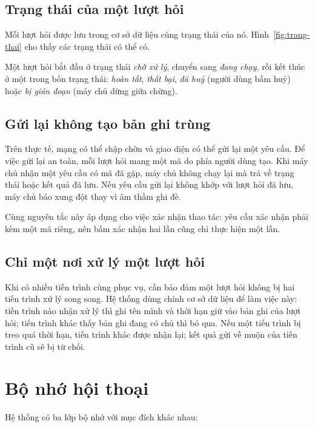 \subsection{Trạng thái của một lượt hỏi}

Mỗi lượt hỏi được lưu trong cơ sở dữ liệu cùng trạng thái của nó. Hình~\ref{fig:trang-thai} cho thấy các trạng thái có thể có.


Một lượt hỏi bắt đầu ở trạng thái \emph{chờ xử lý}, chuyển sang \emph{đang chạy}, rồi kết thúc ở một trong bốn trạng thái: \emph{hoàn tất}, \emph{thất bại}, \emph{đã huỷ} (người dùng bấm huỷ) hoặc \emph{bị gián đoạn} (máy chủ dừng giữa chừng).

\subsection{Gửi lại không tạo bản ghi trùng}

Trên thực tế, mạng có thể chập chờn và giao diện có thể gửi lại một yêu cầu. Để việc gửi lại an toàn, mỗi lượt hỏi mang một mã do phía người dùng tạo. Khi máy chủ nhận một yêu cầu có mã đã gặp, máy chủ không chạy lại mà trả về trạng thái hoặc kết quả đã lưu. Nếu yêu cầu gửi lại không khớp với lượt hỏi đã lưu, máy chủ báo xung đột thay vì âm thầm ghi đè.

Cùng nguyên tắc này áp dụng cho việc xác nhận thao tác: yêu cầu xác nhận phải kèm một mã riêng, nên bấm xác nhận hai lần cũng chỉ thực hiện một lần.

\subsection{Chỉ một nơi xử lý một lượt hỏi}

Khi có nhiều tiến trình cùng phục vụ, cần bảo đảm một lượt hỏi không bị hai tiến trình xử lý song song. Hệ thống dùng chính cơ sở dữ liệu để làm việc này: tiến trình nào nhận xử lý thì ghi tên mình và thời hạn giữ vào bản ghi của lượt hỏi; tiến trình khác thấy bản ghi đang có chủ thì bỏ qua. Nếu một tiến trình bị treo quá thời hạn, tiến trình khác được nhận lại; kết quả gửi về muộn của tiến trình cũ sẽ bị từ chối.

\section{Bộ nhớ hội thoại}

Hệ thống có ba lớp bộ nhớ với mục đích khác nhau:


